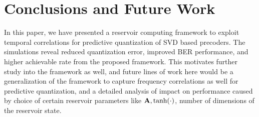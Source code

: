 \documentclass[conference]{IEEEtran}
\begin{document}
\section{Conclusions and Future Work}
\label{section5}
In this paper, we have presented a reservoir computing framework to exploit temporal correlations for predictive quantization of SVD based precoders. The simulations reveal reduced quantization error, improved BER performance, and higher achievable rate from the proposed framework. This motivates further study into the framework as well, and future lines of work here would be a generalization of the framework to capture frequency correlations as well for predictive quantization, and a detailed analysis of impact on performance caused by choice of certain reservoir parameters like ${\bf A},\text{tanh}(\cdot)$, number of dimensions of the reservoir state.




\renewcommand{\bibfont}{\footnotesize}


\end{document}
